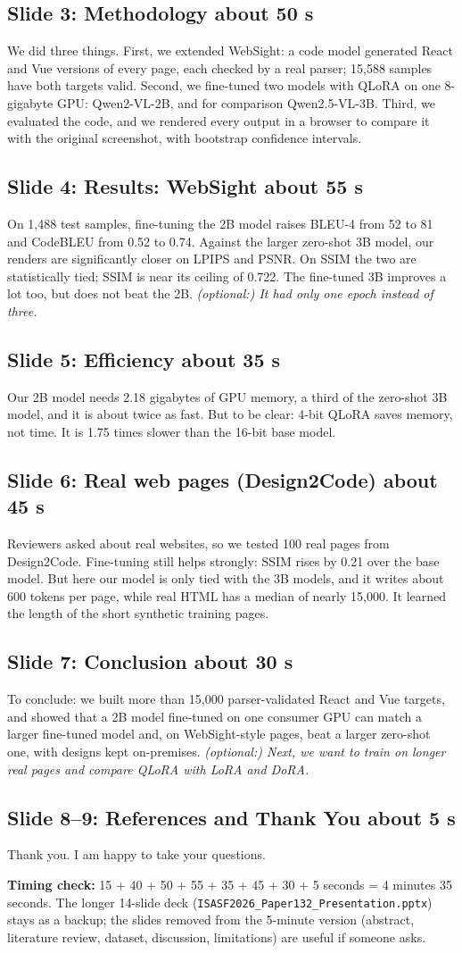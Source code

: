 \documentclass[11pt,a4paper]{article}
\newcommand{\slide}[3]{\subsection*{Slide #1: #2 \hfill\normalfont\small\color{teal}about #3}}
\newcommand{\say}[1]{\par\noindent\colorbox{tint}{\parbox{\dimexpr\linewidth-2\fboxsep}{#1}}\par}
\begin{document}
\slide{3}{Methodology}{50 s}
\say{We did three things. First, we extended WebSight: a code model generated React and Vue versions of every page,
each checked by a real parser; 15,588 samples have both targets valid.
Second, we fine-tuned two models with QLoRA on one 8-gigabyte GPU: Qwen2-VL-2B, and for comparison Qwen2.5-VL-3B.
Third, we evaluated the code, and we rendered every output in a browser to compare it with the original screenshot,
with bootstrap confidence intervals.}

\slide{4}{Results: WebSight}{55 s}
\say{On 1,488 test samples, fine-tuning the 2B model raises BLEU-4 from 52 to 81 and CodeBLEU from 0.52 to 0.74.
Against the larger zero-shot 3B model, our renders are significantly closer on LPIPS and PSNR.
On SSIM the two are statistically tied; SSIM is near its ceiling of 0.722.
The fine-tuned 3B improves a lot too, but does not beat the 2B. \textit{(optional:) It had only one epoch instead of three.}}

\slide{5}{Efficiency}{35 s}
\say{Our 2B model needs 2.18 gigabytes of GPU memory, a third of the zero-shot 3B model, and it is about twice as fast.
But to be clear: 4-bit QLoRA saves memory, not time. It is 1.75 times slower than the 16-bit base model.}

\slide{6}{Real web pages (Design2Code)}{45 s}
\say{Reviewers asked about real websites, so we tested 100 real pages from Design2Code.
Fine-tuning still helps strongly: SSIM rises by 0.21 over the base model.
But here our model is only tied with the 3B models, and it writes about 600 tokens per page, while real HTML has a
median of nearly 15,000. It learned the length of the short synthetic training pages.}

\slide{7}{Conclusion}{30 s}
\say{To conclude: we built more than 15,000 parser-validated React and Vue targets, and showed that a 2B model
fine-tuned on one consumer GPU can match a larger fine-tuned model and, on WebSight-style pages, beat a larger zero-shot
one, with designs kept on-premises.
\textit{(optional:) Next, we want to train on longer real pages and compare QLoRA with LoRA and DoRA.}}

\slide{8--9}{References and Thank You}{5 s}
\say{Thank you. I am happy to take your questions.}

\medskip
\noindent\textbf{Timing check:} 15 + 40 + 50 + 55 + 35 + 45 + 30 + 5 seconds = 4 minutes 35 seconds.
The longer 14-slide deck (\texttt{ISASF2026\_Paper132\_Presentation.pptx}) stays as a backup; the slides removed from
the 5-minute version (abstract, literature review, dataset, discussion, limitations) are useful if someone asks.
\end{document}
